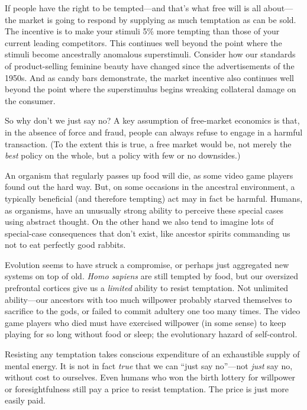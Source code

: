 {
 If people have the right to be tempted---and
that's what free will is all about---the market is
going to respond by supplying as much temptation as can be sold. The
incentive is to make your stimuli 5\% more tempting than those of your
current leading competitors. This continues well beyond the point where
the stimuli become ancestrally anomalous superstimuli. Consider how our
standards of product-selling feminine beauty have changed since the
advertisements of the 1950s. And as candy bars demonstrate, the market
incentive also continues well beyond the point where the superstimulus
begins wreaking collateral damage on the consumer.}

{
 So why don't we just say no? A key assumption of
free-market economics is that, in the absence of force and fraud,
people can always refuse to engage in a harmful transaction. (To the
extent this is true, a free market would be, not merely the
\textit{best} policy on the whole, but a policy with few or no
downsides.)}

{
 An organism that regularly passes up food will die, as some video
game players found out the hard way. But, on some occasions in the
ancestral environment, a typically beneficial (and therefore tempting)
act may in fact be harmful. Humans, as organisms, have an unusually
strong ability to perceive these special cases using abstract thought.
On the other hand we also tend to imagine lots of special-case
consequences that don't exist, like ancestor spirits
commanding us not to eat perfectly good rabbits.}

{
 Evolution seems to have struck a compromise, or perhaps just
aggregated new systems on top of old. \textit{Homo sapiens} are still
tempted by food, but our oversized prefrontal cortices give us a
\textit{limited} ability to resist temptation. Not unlimited
ability---our ancestors with too much willpower probably starved
themselves to sacrifice to the gods, or failed to commit adultery one
too many times. The video game players who died must have exercised
willpower (in some sense) to keep playing for so long without food or
sleep; the evolutionary hazard of self-control.}

{
 Resisting any temptation takes conscious expenditure of an
exhaustible supply of mental energy. It is not in fact \textit{true}
that we can ``just say no''---not
\textit{just} say no, without cost to ourselves. Even humans who won
the birth lottery for willpower or foresightfulness still pay a price
to resist temptation. The price is just more easily paid.}

